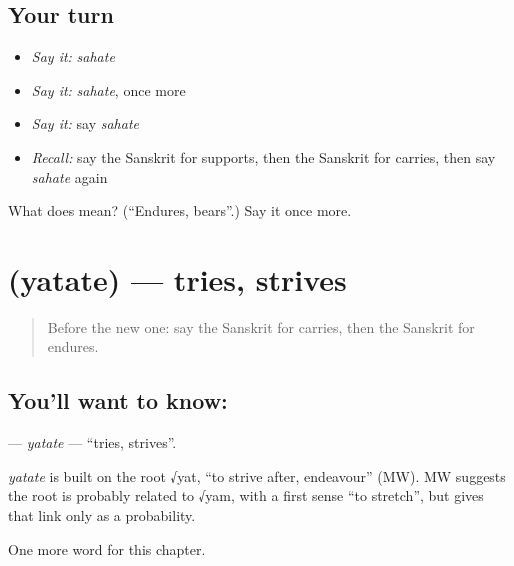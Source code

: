 \subsection*{Your turn}
\begin{itemize}
\raggedright
  \item \emph{Say it:} \emph{sahate}
  \item \emph{Say it:} \emph{sahate}, once more
  \item \emph{Say it:} say \emph{sahate}
  \item \emph{Recall:} say the Sanskrit for supports, then the Sanskrit for carries, then say \emph{sahate} again
\end{itemize}

\begin{tcolorbox}[breakable,colback=teal!4,colframe=teal!35!black,title={Before you move on}]
What does  mean? (\textquotedblleft{}Endures, bears\textquotedblright{}.) Say it once more.
\end{tcolorbox}
\section[\texorpdfstring{\sk{यतते} (yatate)}{यतते (yatate)}]{ (yatate) — tries, strives}

\label{lesson:SA-C175-yatate}



\begin{quote}
Before the new one: say the Sanskrit for carries, then the Sanskrit for endures.
\end{quote}

\subsection*{You'll want to know: }
\textbf{} — \emph{yatate} — \textquotedblleft{}tries, strives\textquotedblright{}.

\begin{cousinweb}
\emph{yatate} is built on the root √yat, \textquotedblleft{}to strive after, endeavour\textquotedblright{} (MW). MW suggests the root is probably related to √yam, with a first sense \textquotedblleft{}to stretch\textquotedblright{}, but gives that link only as a probability.
\end{cousinweb}

\begin{grammarlens}[title={What you've built}]
One more word for this chapter.
\end{grammarlens}


